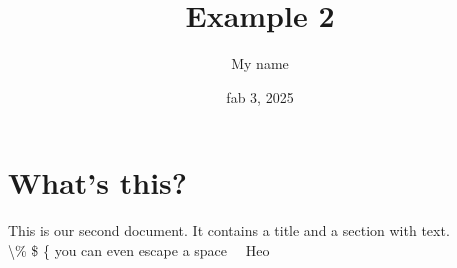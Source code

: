 \documentclass[a4paper, 11pt]{article}
\title{Example 2}
\author{My name}
\date{fab 3, 2025}
\begin{document}
\maketitle

\section{What's this?}
This is our second document. It contains a title and a section with text. \\ \textbackslash \% \$ \{
you can even escape a space \ \ Heo
\end{document}
